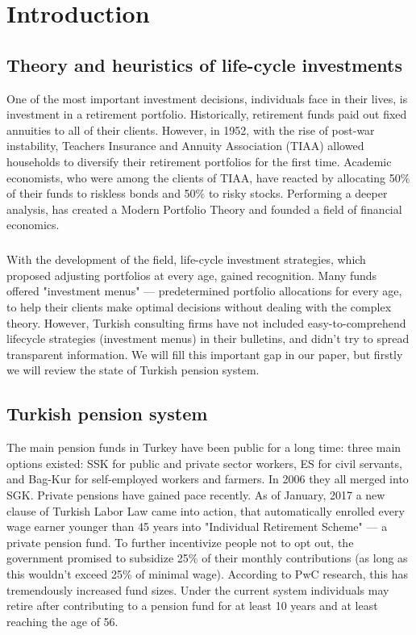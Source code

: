 \chapter{Introduction} %
\label{intro} %


\section{Theory and heuristics of life-cycle investments}
One of the most important investment decisions, individuals face in their lives, is investment in a retirement portfolio. Historically, retirement funds paid out fixed annuities to all of their clients. However, in 1952, with the rise of post-war instability, Teachers Insurance and Annuity Association (TIAA) allowed households to diversify their retirement portfolios for the first time. Academic economists, who were among the clients of TIAA, have reacted by allocating 50\% of their funds to riskless bonds and 50\% to risky stocks. Performing a deeper analysis, \citet{markowitz} has created a Modern Portfolio Theory and founded a field of financial economics.
 
\paragraph*{} 
With the development of the field, life-cycle investment strategies, which proposed adjusting portfolios at every age, gained recognition. Many funds offered "investment menus" --- predetermined portfolio allocations for every age, to help their clients make optimal decisions without dealing with the complex theory. However, Turkish consulting firms have not included easy-to-comprehend lifecycle strategies (investment menus) in their bulletins, and didn't try to spread transparent information. We will fill this important gap in our paper, but firstly we will review the state of Turkish pension system.

\section{Turkish pension system}
The main pension funds in Turkey have been public for a long time: three main options existed: SSK for public and private sector workers, ES for civil servants, and Bag-Kur for self-employed workers and farmers. In 2006 they all merged into SGK. Private pensions have gained pace recently. As of January, 2017 a new clause of Turkish Labor Law came into action, that automatically enrolled every wage earner younger than 45 years into "Individual Retirement Scheme" --- a private pension fund. To further incentivize people not to opt out, the government promised to subsidize 25\% of their monthly contributions (as long as this wouldn't exceed 25\% of minimal wage). According to PwC research, this has tremendously increased fund sizes. Under the current system individuals may retire after contributing to a pension fund for at least 10 years and at least reaching the age of 56.
